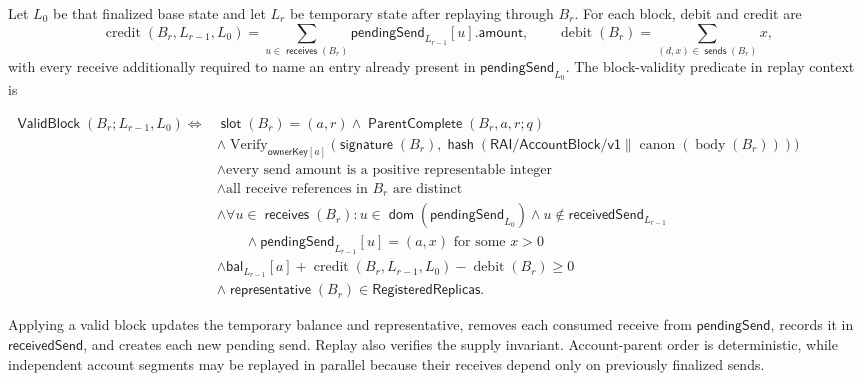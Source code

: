\documentclass[sigplan,twocolumn,review,anonymous]{acmart}
\newcommand{\func}[1]{\operatorname{\mathsf{#1}}}
\newcommand{\hash}{\func{hash}}
\newcommand{\dom}{\func{dom}}
\newcommand{\ParentComplete}{\func{ParentComplete}}
\newcommand{\ValidBlock}{\func{ValidBlock}}
\newcommand{\slotOf}{\func{slot}}
\newcommand{\ownerKey}{\mathsf{ownerKey}}
\newcommand{\signatureOf}{\func{signature}}
\newcommand{\sendsOf}{\func{sends}}
\newcommand{\receivesOf}{\func{receives}}
\newcommand{\representativeOf}{\func{representative}}
\newcommand{\bal}{\mathsf{bal}}
\newcommand{\pendingSend}{\mathsf{pendingSend}}
\newcommand{\receivedSend}{\mathsf{receivedSend}}
\begin{document}
Let \(L_0\) be that finalized base state and let \(L_r\) be temporary state after replaying through
\(B_r\).  For each block, debit and credit are
\[
\operatorname{credit}(B_r,L_{r-1},L_0)=
\sum_{u\in\receivesOf(B_r)}\pendingSend_{L_{r-1}}[u].\mathsf{amount},
\qquad
\operatorname{debit}(B_r)=\sum_{(d,x)\in\sendsOf(B_r)}x,
\]
with every receive additionally required to name an entry already present in
\(\pendingSend_{L_0}\).  The block-validity predicate in replay context is
\begin{center}
\begin{adjustbox}{max width=\columnwidth}
\(\displaystyle
\begin{aligned}
\ValidBlock(B_r;L_{r-1},L_0)\iff{}& \slotOf(B_r)=(a,r)\wedge\ParentComplete(B_r,a,r;q)\\
&\wedge\operatorname{Verify}_{\ownerKey[a]}
 \bigl(\signatureOf(B_r),
 \hash(\mathsf{RAI/AccountBlock/v1}\parallel\operatorname{canon}(\operatorname{body}(B_r)))\bigr)\\
&\wedge\text{every send amount is a positive representable integer}\\
&\wedge\text{all receive references in }B_r\text{ are distinct}\\
&\wedge\forall u\in\receivesOf(B_r):
 u\in\dom(\pendingSend_{L_0})\wedge u\notin\receivedSend_{L_{r-1}}\\
&\qquad\wedge\pendingSend_{L_{r-1}}[u]=(a,x)\text{ for some }x>0\\
&\wedge\bal_{L_{r-1}}[a]+\operatorname{credit}(B_r,L_{r-1},L_0)-\operatorname{debit}(B_r)\ge0\\
&\wedge\representativeOf(B_r)\in\mathsf{RegisteredReplicas}.
\end{aligned}
\)
\end{adjustbox}
\end{center}
Applying a valid block updates the temporary balance and representative, removes each consumed receive
from \(\pendingSend\), records it in \(\receivedSend\), and creates each new pending send.  Replay
also verifies the supply invariant.  Account-parent order is deterministic, while independent account
segments may be replayed in parallel because their receives depend only on previously finalized sends.
\end{document}
